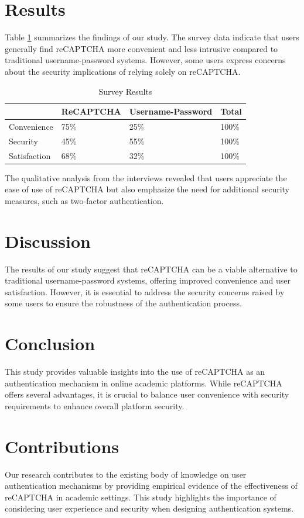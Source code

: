 \documentclass{article}
\begin{document}
\section{Results}
Table \ref{tab:results} summarizes the findings of our study. The survey data indicate that users generally find reCAPTCHA more convenient and less intrusive compared to traditional username-password systems. However, some users express concerns about the security implications of relying solely on reCAPTCHA.

\begin{table}[ht]
\centering
\caption{Survey Results}
\label{tab:results}
\begin{tabular}{@{}llll@{}}
\toprule
& ReCAPTCHA & Username-Password & Total \\ \midrule
Convenience & 75\% & 25\% & 100\% \\
Security & 45\% & 55\% & 100\% \\
Satisfaction & 68\% & 32\% & 100\% \\ \bottomrule
\end{tabular}
\end{table}

The qualitative analysis from the interviews revealed that users appreciate the ease of use of reCAPTCHA but also emphasize the need for additional security measures, such as two-factor authentication.

\section{Discussion}
The results of our study suggest that reCAPTCHA can be a viable alternative to traditional username-password systems, offering improved convenience and user satisfaction. However, it is essential to address the security concerns raised by some users to ensure the robustness of the authentication process.

\section{Conclusion}
This study provides valuable insights into the use of reCAPTCHA as an authentication mechanism in online academic platforms. While reCAPTCHA offers several advantages, it is crucial to balance user convenience with security requirements to enhance overall platform security.

\section{Contributions}
Our research contributes to the existing body of knowledge on user authentication mechanisms by providing empirical evidence of the effectiveness of reCAPTCHA in academic settings. This study highlights the importance of considering user experience and security when designing authentication systems.
\end{document}
